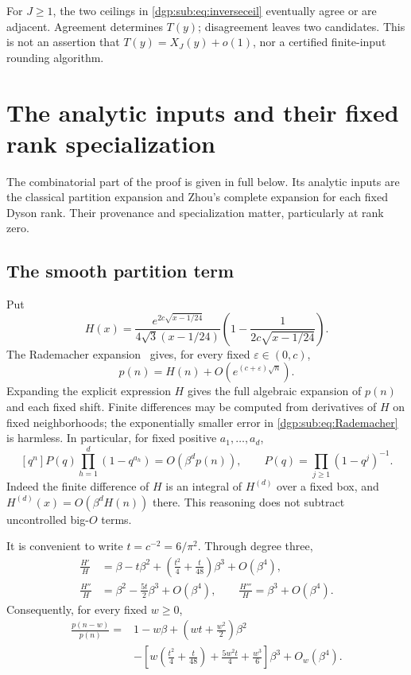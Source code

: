 \documentclass[11pt,letterpaper]{article}
\numberwithin{equation}{section}
\theoremstyle{remark}\newtheorem{remark}[theorem]{Remark}
\begin{document}
For $J\geq1$, the two ceilings in \eqref{dgp:sub:eq:inverseceil} eventually
agree or are adjacent. Agreement determines $T(y)$; disagreement
leaves two candidates. This is not an assertion that
$T(y)=X_J(y)+o(1)$, nor a certified finite-input rounding algorithm.

\section{The analytic inputs and their fixed rank specialization}\label{dgp:sub:sec:analytic}
The combinatorial part of the proof is given in full below. Its
analytic inputs are the classical partition expansion and Zhou's
complete expansion for each fixed Dyson rank. Their provenance and
specialization matter, particularly at rank zero.

\subsection{The smooth partition term}
Put
\begin{equation}\label{dgp:sub:eq:H}
 H(x)=\frac{e^{2c\sqrt{x-1/24}}}{4\sqrt3(x-1/24)}
           \left(1-\frac1{2c\sqrt{x-1/24}}\right).
\end{equation}
The Rademacher expansion~\cite{dlmfpart} gives, for every fixed
$\varepsilon\in(0,c)$,
\begin{equation}\label{dgp:sub:eq:Rademacher}
 p(n)=H(n)+O\!\left(e^{(c+\varepsilon)\sqrt n}\right).
\end{equation}
Expanding the explicit expression $H$ gives the full algebraic
expansion of $p(n)$ and each fixed shift. Finite differences may be
computed from derivatives of $H$ on fixed neighborhoods; the
exponentially smaller error in \eqref{dgp:sub:eq:Rademacher} is harmless.
In particular, for fixed positive $a_1,\ldots,a_d$,
\begin{equation}\label{dgp:sub:eq:boxordinary}
 [q^n]P(q)\prod_{h=1}^{d}(1-q^{a_h})=O(\beta^d p(n)),
 \qquad P(q)=\prod_{j\geq1}(1-q^j)^{-1}.
\end{equation}
Indeed the finite difference of $H$ is an integral of $H^{(d)}$ over
a fixed box, and $H^{(d)}(x)=O(\beta^dH(n))$ there. This reasoning
does not subtract uncontrolled big-$O$ terms.

It is convenient to write $t=c^{-2}=6/\pi^2$. Through degree three,
\begin{align}
 \frac{H'}H&=\beta-t\beta^2+\left(\frac{t^2}4+\frac t{48}\right)\beta^3
              +O(\beta^4),\label{dgp:sub:eq:Hratios}\\
 \frac{H''}H&=\beta^2-\frac{5t}2\beta^3+O(\beta^4),\qquad
 \frac{H'''}H=\beta^3+O(\beta^4).\nonumber
\end{align}
Consequently, for every fixed $w\geq0$,
\begin{align}\label{dgp:sub:eq:pshift}
 \frac{p(n-w)}{p(n)}={}&1-w\beta+\left(wt+\frac{w^2}2\right)\beta^2\nonumber\\
 &-\left[w\left(\frac{t^2}4+\frac t{48}\right)
          +\frac{5w^2t}4+\frac{w^3}6\right]\beta^3+O_w(\beta^4).
\end{align}
\end{document}
